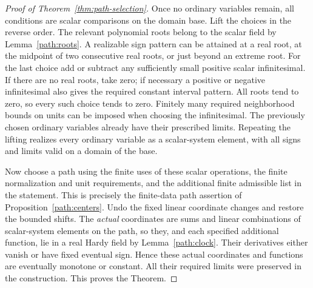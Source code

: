 \begin{proof}[Proof of Theorem~\ref{thm:path-selection}]
Once no ordinary variables remain, all conditions are scalar
comparisons on the domain base.  Lift the choices in the reverse
order.  The relevant polynomial roots belong to the scalar field by
Lemma~\ref{path:roots}.  A realizable sign pattern can be attained at
a real root, at the midpoint of two consecutive real roots, or just
beyond an extreme root.  For the last choice add or subtract any
sufficiently small positive scalar infinitesimal.  If there are no
real roots, take zero; if necessary a positive or negative infinitesimal
also gives the required constant interval pattern.  All roots tend
to zero, so every such choice tends to zero.  Finitely many required
neighborhood bounds on units can be imposed when choosing the
infinitesimal.  The previously chosen ordinary variables already have
their prescribed limits.  Repeating the lifting realizes every
ordinary variable as a scalar-system element, with all signs and
limits valid on a domain of the base.

Now choose a path using the finite uses of these scalar operations,
the finite normalization and unit requirements, and the additional
finite admissible list in the statement.  This is precisely the
finite-data path assertion of Proposition~\ref{path:centers}.
Undo the fixed linear coordinate changes and restore the bounded
shifts.  The \emph{actual} coordinates are sums and linear combinations
of scalar-system elements on the path, so they, and each specified
additional function, lie in a real Hardy field by
Lemma~\ref{path:clock}.  Their derivatives either vanish or have
fixed eventual sign.  Hence these actual coordinates and functions
are eventually monotone or constant.  All their required limits were
preserved in the construction.  This proves the Theorem.
\end{proof}
